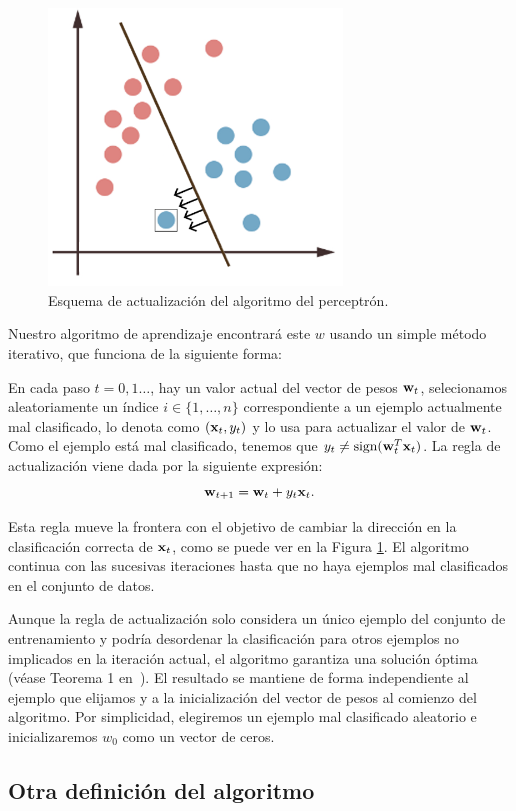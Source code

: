 \documentclass[oneside,openright,titlepage,numbers=noenddot,openany,headinclude,footinclude=true,
cleardoublepage=empty,abstractoff,BCOR=5mm,paper=a4,fontsize=12pt,main=spanish]{scrreprt}
\begin{document}
\begin{figure}[h]
	\centering
	\includegraphics[width=7.8cm]{movclassified.png}
	\caption{Esquema de actualización del algoritmo del perceptrón.}
    \label{fig:movsep}
\end{figure}

Nuestro algoritmo de aprendizaje encontrará este $w$ usando un simple método iterativo, que funciona de la siguiente forma:

En cada paso $t=0,1\dots$, hay un valor actual del vector de pesos $\textbf{w}_t$, selecionamos aleatoriamente un índice $i\in \{1,\dots,n\}$ correspondiente a un ejemplo actualmente mal clasificado, lo denota como $(\textbf{x}_t,y_t)$ y lo usa para actualizar el valor de $\textbf{w}_t$. Como el ejemplo está mal clasificado, tenemos que $y_t\neq \text{sign}(\textbf{w}^T_t\textbf{x}_t)$. La regla de actualización viene dada por la siguiente expresión: $$\textbf{w}_{t+1}=\textbf{w}_t+y_t\textbf{x}_t.$$

Esta regla mueve la frontera con el objetivo de cambiar la dirección en la clasificación correcta de $\textbf{x}_t$, como se puede ver en la Figura \ref{fig:movsep}. El algoritmo continua con las sucesivas iteraciones hasta que no haya ejemplos mal clasificados en el conjunto de datos.

Aunque la regla de actualización solo considera un único ejemplo del conjunto de entrenamiento y podría desordenar la clasificación para otros ejemplos no implicados en la iteración actual, el algoritmo garantiza una solución óptima (véase Teorema 1 en~\cite{perceptronproof2012}). El resultado se mantiene de forma independiente al ejemplo que elijamos y a la inicialización del vector de pesos al comienzo del algoritmo. Por simplicidad, elegiremos un ejemplo mal clasificado aleatorio e inicializaremos $w_0$ como un vector de ceros.

\subsection*{Otra definición del algoritmo}
\end{document}
